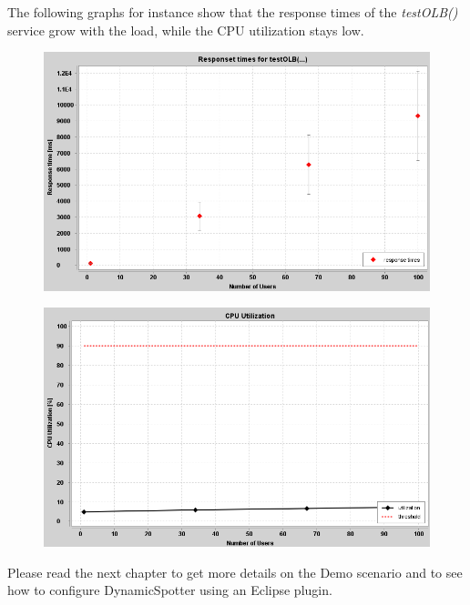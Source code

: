 \documentclass{report}
\newcommand{\DS}{DynamicSpotter }
\begin{document}
\begin{enumerate}
		The following graphs for instance show that the response times of the \emph{testOLB()} service grow with the load,
		while the CPU utilization stays low.
		 \begin{figure}[h!]
			\centering
			\includegraphics[width=\textwidth]{figures/quickStart/SNAG-0008.png}
			\label{fig:unpackedArchive}
		\end{figure}
		\begin{figure}[h!]
			\centering
			\includegraphics[width=\textwidth]{figures/quickStart/SNAG-0009.png}
			\label{fig:unpackedArchive}
		\end{figure}
		
		Please read the next chapter to get more details on the Demo scenario and to see how to
		configure \DS using an Eclipse plugin.
\end{enumerate}




\newpage
\newpage
\end{document}
